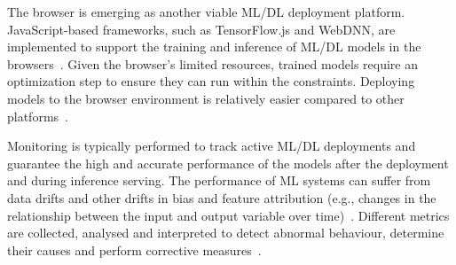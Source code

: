 The browser is emerging as another viable ML/DL deployment platform. JavaScript-based frameworks, such as TensorFlow.js and WebDNN, are implemented to support the training and inference of ML/DL models in the browsers~\cite{Ma}. Given the browser's limited resources, trained models require an optimization step to ensure they can run within the constraints. Deploying models to the browser environment is relatively easier compared to other platforms~\cite{Chen}.

Monitoring is typically performed to track active ML/DL deployments and guarantee the high and accurate performance of the models after the deployment and during inference serving. The performance of ML systems can suffer from data drifts and other drifts in bias and feature attribution (e.g., changes in the relationship between the input and output variable over time)~\cite{Nigenda}. Different metrics are collected, analysed and interpreted to detect abnormal behaviour, determine their causes and perform corrective measures~\cite{Nigenda}.

